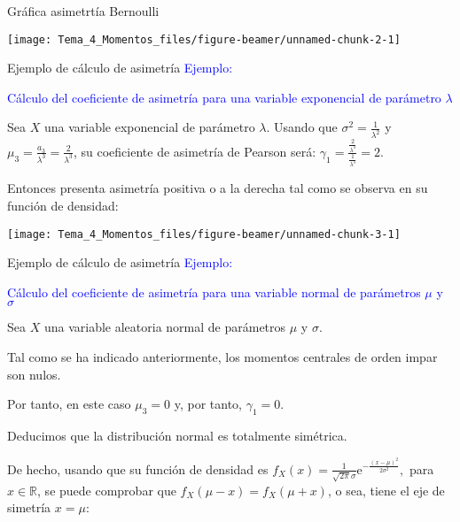 \documentclass[
  ignorenonframetext,
  aspectratio=169]{beamer}
\newcommand\blue[1]{\textcolor{blue}{#1}}
\begin{document}
\begin{frame}{Gráfica asimetrtía Bernoulli}
\protect\hypertarget{gruxe1fica-asimetrtuxeda-bernoulli}{}
\begin{center}\texttt{[image: Tema\_4\_Momentos\_files/figure-beamer/unnamed-chunk-2-1]} \end{center}
\end{frame}

\begin{frame}{Ejemplo de cálculo de asimetría}
\protect\hypertarget{ejemplo-de-cuxe1lculo-de-asimetruxeda-1}{}
\blue{Ejemplo:}

\blue{Cálculo del coeficiente de asimetría para una variable exponencial de parámetro $\lambda$}

Sea \(X\) una variable exponencial de parámetro \(\lambda\). Usando que
\(\sigma^2=\frac{1}{\lambda^2}\) y
\(\mu_3 =\frac{a_3}{\lambda^3}=\frac{2}{\lambda^3}\), su coeficiente de
asimetría de Pearson será:
\(\gamma_1 = \frac{\frac{2}{\lambda^3}}{\frac{1}{\lambda^3}}=2.\)

Entonces presenta asimetría positiva o a la derecha tal como se observa
en su función de densidad:

\begin{center}\texttt{[image: Tema\_4\_Momentos\_files/figure-beamer/unnamed-chunk-3-1]} \end{center}
\end{frame}

\begin{frame}{Ejemplo de cálculo de asimetría}
\protect\hypertarget{ejemplo-de-cuxe1lculo-de-asimetruxeda-2}{}
\blue{Ejemplo:}

\blue{Cálculo del coeficiente de asimetría para una variable normal de parámetros $\mu$ y $\sigma$}

Sea \(X\) una variable aleatoria normal de parámetros \(\mu\) y
\(\sigma\).

Tal como se ha indicado anteriormente, los momentos centrales de orden
impar son nulos.

Por tanto, en este caso \(\mu_3=0\) y, por tanto, \(\gamma_1=0\).

Deducimos que la distribución normal es totalmente simétrica.

De hecho, usando que su función de densidad es
\(f_X(x)=\frac{1}{\sqrt{2\pi}\sigma}\mathrm{e}^{-\frac{(x-\mu)^2}{2\sigma^2}},\)
para \(x\in \mathbb{R}\), se puede comprobar que
\(f_X(\mu-x)=f_X(\mu +x)\), o sea, tiene el eje de simetría \(x=\mu\):
\end{frame}
\end{document}
